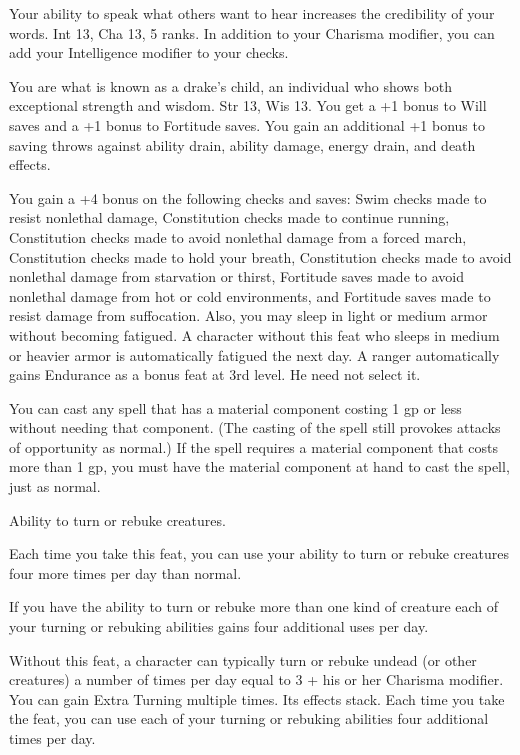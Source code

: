 {Your ability to speak what others want to hear increases the credibility of your words.}
{Int 13, Cha 13,  5 ranks.}
{In addition to your Charisma modifier, you can add your Intelligence modifier to your  checks.}
{}{}

{You are what is known as a drake's child, an individual who shows both exceptional strength and wisdom.}
{Str 13, Wis 13.}
{You get a +1 bonus to Will saves and a +1 bonus to Fortitude saves. You gain an additional +1 bonus to saving throws against ability drain, ability damage, energy drain, and death effects.}
{}{}

{You gain a +4 bonus on the following checks and saves: Swim checks made to resist nonlethal damage, Constitution checks made to continue running, Constitution checks made to avoid nonlethal damage from a forced march, Constitution checks made to hold your breath, Constitution checks made to avoid nonlethal damage from starvation or thirst, Fortitude saves made to avoid nonlethal damage from hot or cold environments, and Fortitude saves made to resist damage from suffocation. Also, you may sleep in light or medium armor without becoming fatigued.}
{A character without this feat who sleeps in medium or heavier armor is automatically fatigued the next day.}{}
{A ranger automatically gains Endurance as a bonus feat at 3rd level. He need not select it.}

{You can cast any spell that has a material component costing 1 gp or less without needing that component. (The casting of the spell still provokes attacks of opportunity as normal.) If the spell requires a material component that costs more than 1 gp, you must have the material component at hand to cast the spell, just as normal.}

{Ability to turn or rebuke creatures.}
{Each time you take this feat, you can use your ability to turn or rebuke creatures four more times per day than normal.

If you have the ability to turn or rebuke more than one kind of creature each of your turning or rebuking abilities gains four additional uses per day.}
{Without this feat, a character can typically turn or rebuke undead (or other creatures) a number of times per day equal to 3 + his or her Charisma modifier.}
{You can gain Extra Turning multiple times. Its effects stack. Each time you take the feat, you can use each of your turning or rebuking abilities four additional times per day.}

